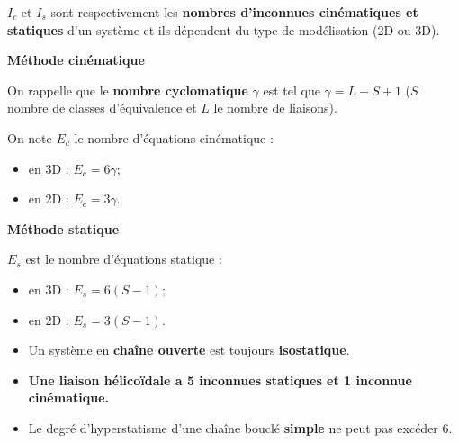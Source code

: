 \begin{defi}[Notations]

$I_c$ et $I_s$ sont respectivement les \textbf{nombres d'inconnues cinématiques et statiques} d'un système et ils dépendent du type de modélisation (2D ou 3D).


\begin{multicols}{2}
\begin{center}
\textbf{Méthode cinématique}
\end{center}


On rappelle que le \textbf{nombre cyclomatique}  $\gamma$
est tel que $\gamma=L-S+1$ ($S$ nombre de classes d'équivalence et $L$ le nombre de liaisons).

On note $E_c$ le nombre d'équations cinématique :%
\begin{itemize}
 \item en 3D : $E_c=6\gamma$;%
 \item en 2D : $E_c=3\gamma$.%
\end{itemize}

\vfill\null
\columnbreak

\begin{center}
\textbf{Méthode statique} 
\end{center}


$E_s$ est le nombre d'équations statique :
\begin{itemize}
\item en 3D : $E_s=6 (S-1)$;
\item en 2D : $E_s=3 (S-1)$.
\end{itemize}

\end{multicols}
\end{defi}


\begin{remarque}[s]

\begin{itemize}
\item Un système en \textbf{chaîne ouverte} est toujours \textbf{isostatique}.%
\item \textbf{Une liaison hélicoïdale a 5 inconnues statiques et 1 inconnue cinématique.}
\item Le degré d'hyperstatisme d'une chaîne bouclé \textbf{simple} ne peut pas excéder 6.
\end{itemize}
\end{remarque}


